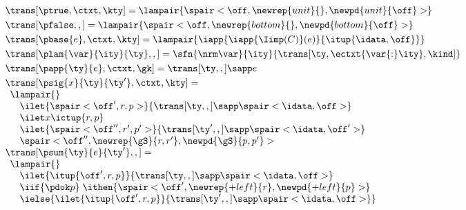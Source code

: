{\begin{figure}
\small
{} 

\[
\begin{array}{l}
\trans[\ptrue,\ctxt,\kty] =
  \lampair{\spair<\off,\newrep{unit}{},\newpd{unit}{\off}>}
\\[3pt] %
\trans[\pfalse,,] =
  \lampair{\spair<\off,\newrep {bottom}{},\newpd {bottom}{\off}>}
\\[3pt] %
\trans[\pbase{e},\ctxt,\kty] =
  \lampair{\iapp {\iapp {\Iimp(C)} (e)} {\itup {\idata,\off}}}
\\[3pt] %
\trans[\plam{\var}{\ity}{\ty},,] =
   \sfn{\nrm\var}{\ity}{\trans[\ty,\ectxt{\var{:}\ity},\kind]}
\\[3pt] %
\trans[\papp{\ty}{e},\ctxt,\gk] =
  \trans[\ty,,] \sapp e  
\\[3pt]
\trans[\psig{x}{\ty}{\ty'},\ctxt,\kty] = \\
  \begin{array}{l}  
    \lampair{} \\
    \quad  \ilet {\spair<\off',r,p>} 
    {{\trans[\ty,,]} \sapp \spair<\idata,\off>} \\
    \quad  \ilet x {\ictup{r,p}}\\
    \quad  \ilet {\spair<\off'',r',p'>} 
    {{\trans[\ty',,]} \sapp \spair<\idata,\off'>} \\
    \quad \spair<\off'',\newrep {\gS}{r,r'},\newpd {\gS}{p,p'}>
  \end{array}  
\\[3pt]
  \trans[\psum{\ty}{e}{\ty'},,] = \\
  \begin{array}{l}  
  \lampair{} \\
  \quad \ilet {\itup{\off',r,p}}{\trans[\ty,,] \sapp \spair<\idata,\off>} \\
  \quad \iif {\pdok p} \; \ithen {
    \def \r {\newrep {+left}{r}}
    \def \p {\newpd {+left}{p}}
    \spair<\off',\r,\p>} \\
  \quad \ielse {\ilet {\itup{\off',r,p}}{\trans[\ty',,] \sapp \spair<\idata,\off>}} \\
  \quad 
  {  %
}
\end{array}
\end{array}\]
\end{figure}}
